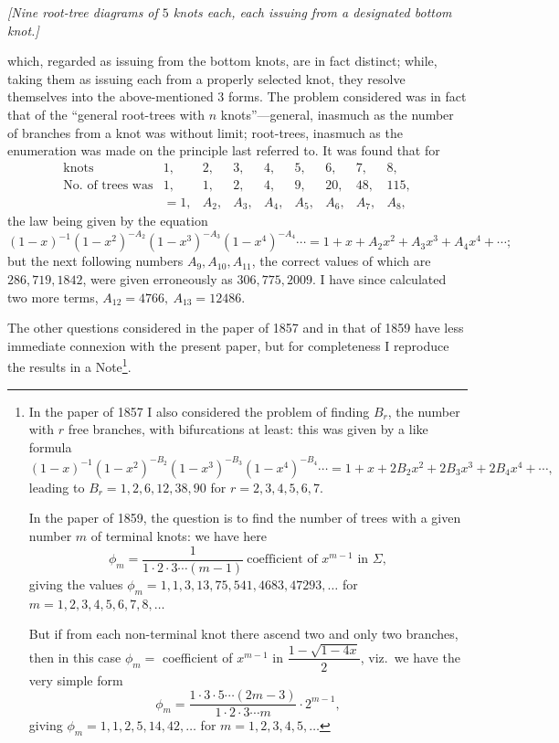 \documentclass[11pt,a4paper]{article}
\begin{document}
\begin{center}
\textit{[Nine root-tree diagrams of $5$ knots each, each issuing from a designated bottom knot.]}
\end{center}

which, regarded as issuing from the bottom knots, are in fact distinct; while, taking them as issuing each from a properly selected knot, they resolve themselves into the above-mentioned $3$ forms. The problem considered was in fact that of the ``general root-trees with $n$ knots''---general, inasmuch as the number of branches from a knot was without limit; root-trees, inasmuch as the enumeration was made on the principle last referred to. It was found that for
\[
\begin{array}{lccccccccc}
\text{knots} & 1, & 2, & 3, & 4, & 5, & 6, & 7, & 8,\\
\text{No.\ of trees was} & 1, & 1, & 2, & 4, & 9, & 20, & 48, & 115,\\
& = 1, & A_{2}, & A_{3}, & A_{4}, & A_{5}, & A_{6}, & A_{7}, & A_{8},
\end{array}
\]
the law being given by the equation
\[
(1-x)^{-1}(1-x^{2})^{-A_{2}}(1-x^{3})^{-A_{3}}(1-x^{4})^{-A_{4}}\cdots = 1 + x + A_{2}x^{2} + A_{3}x^{3} + A_{4}x^{4} + \cdots;
\]
but the next following numbers $A_{9},A_{10},A_{11}$, the correct values of which are $286,719,1842$, were given erroneously as $306,775,2009$. I have since calculated two more terms, $A_{12} = 4766,\ A_{13} = 12486$.

The other questions considered in the paper of 1857 and in that of 1859 have less immediate connexion with the present paper, but for completeness I reproduce the results in a Note\footnote{In the paper of 1857 I also considered the problem of finding $B_{r}$, the number with $r$ free branches, with bifurcations at least: this was given by a like formula
\[
(1-x)^{-1}(1-x^{2})^{-B_{2}}(1-x^{3})^{-B_{3}}(1-x^{4})^{-B_{4}}\cdots = 1 + x + 2B_{2}x^{2} + 2B_{3}x^{3} + 2B_{4}x^{4} + \cdots,
\]
leading to $B_{r} = 1,2,6,12,38,90$ for $r = 2,3,4,5,6,7.$

In the paper of 1859, the question is to find the number of trees with a given number $m$ of terminal knots: we have here
\[
\phi_{m} = \frac{1}{1\cdot 2\cdot 3\cdots(m-1)}\ \text{coefficient of }x^{m-1}\text{ in }\Sigma,
\]
giving the values $\phi_{m} = 1,1,3,13,75,541,4683,47293,\ldots$ for $m = 1,2,3,4,5,6,7,8,\ldots$

But if from each non-terminal knot there ascend two and only two branches, then in this case $\phi_{m} = $ coefficient of $x^{m-1}$ in $\dfrac{1 - \sqrt{1 - 4x}}{2}$, viz.\ we have the very simple form
\[
\phi_{m} = \frac{1\cdot 3\cdot 5\cdots(2m-3)}{1\cdot 2\cdot 3\cdots m}\cdot 2^{m-1},
\]
giving $\phi_{m} = 1,1,2,5,14,42,\ldots$ for $m = 1,2,3,4,5,\ldots$}.
\end{document}
